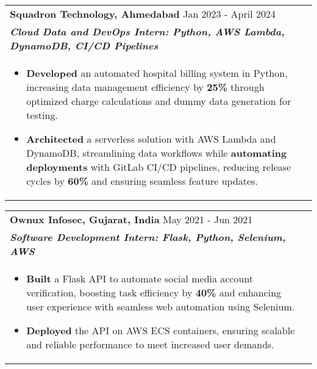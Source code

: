 \documentclass[a4paper,10pt]{article}
\begin{document}
\vspace{-1mm}
\begin{tabularx}{\linewidth}{ @{}l r@{} }
\textbf{Squadron Technology, Ahmedabad} \hfill \color[HTML]{371e77} Jan 2023 - April 2024 \\[1pt]
\color[HTML]{371e77}\textbf{\textit{Cloud Data and DevOps Intern: Python, AWS Lambda, DynamoDB, CI/CD Pipelines}} \\[1pt]
\begin{minipage}[t]{\linewidth}
\begin{itemize}[nosep, after=\strut, leftmargin=2em, itemsep=2pt]
\item \textbf{Developed} an automated hospital billing system in Python, increasing data management efficiency by \textbf{25\%} through optimized charge calculations and dummy data generation for testing.
\item \textbf{Architected} a serverless solution with AWS Lambda and DynamoDB, streamlining data workflows while \textbf{automating deployments} with GitLab CI/CD pipelines, reducing release cycles by \textbf{60\%} and ensuring seamless feature updates.
\end{itemize}
\end{minipage}

\end{tabularx}

\vspace{2pt}

\begin{tabularx}{\linewidth}{ @{}l r@{} }
\textbf{Ownux Infosec, Gujarat, India} \hfill \color[HTML]{371e77} May 2021 - Jun 2021 \\[1pt]
\color[HTML]{371e77}\textbf{\textit{Software Development Intern: Flask, Python, Selenium, AWS}} \\[1pt]
\begin{minipage}[t]{\linewidth}
\begin{itemize}[nosep, after=\strut, leftmargin=2em, itemsep=2pt]
\item \textbf{Built} a Flask API to automate social media account verification, boosting task efficiency by \textbf{40\%} and enhancing user experience with seamless web automation using Selenium.
\item \textbf{Deployed} the API on AWS ECS containers, ensuring scalable and reliable performance to meet increased user demands.
\end{itemize}
\end{minipage}

\end{tabularx}
\end{document}
